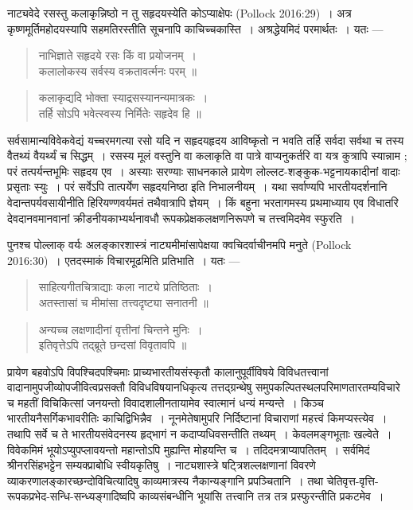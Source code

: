 {\dev नाट्यवेदे रसस्तु कलाकृन्निष्ठो न तु सहृदयस्येति कोऽप्याक्षेपः} (Pollock 2016:29){\dev~। अत्र कृष्णमूर्तिमहोदयस्यापि सहमतिरस्तीति सूचनापि काचिच्चकास्ति~। अश्रद्धेयमिदं परमार्थतः~। यतः ---}
\begin{quote}
{\dev नाभिज्ञाते सहृदये रसः किं वा प्रयोजनम्~।}\\
{\dev कलालोकस्य सर्वस्य वक्रतावर्त्मनः परम् ॥}
\end{quote}
\begin{quote}
{\dev कलाकृद्यदि भोक्ता स्याद्रसस्यानन्यमात्रकः~।}\\
{\dev तर्हि सोऽपि भवेत्स्वस्य निर्मितेः सहृदेव हि ॥}
\end{quote}

{\dev सर्वसामान्यविवेकवेद्यं यच्चरमगत्या रसो यदि न सहृदयहृदय आविष्कृतो न भवति तर्हि सर्वदा सर्वथा च तस्य वैतथ्यं वैयर्थ्यं च सिद्धम्~। रसस्य मूलं वस्तुनि वा कलाकृति वा पात्रे वाप्यनुकर्तरि वा  यत्र कुत्रापि स्यान्नाम ; परं तत्पर्यन्तभूमिः सहृदय एव~। अस्याः सरण्याः साधनकाले प्रायेण लोल्लट-शङ्कुक-भट्टनायकादीनां वादाः प्रसृताः स्युः~। परं सर्वेऽपि तात्पर्येण सहृदयनिष्ठा इति निभालनीयम्~। यथा सर्वाण्यपि भारतीयदर्शनानि वेदान्तपर्यवसायीनीति हिरियण्णवर्यमतं तथैवात्रापि ज्ञेयम्~। किं बहुना भरतागमस्य प्रथमाध्याय एव विधातरि देवदानवमानवानां क्रीडनीयकाभ्यर्थनावधौ रूपकप्रेक्षकलक्षणनिरूपणे च तत्त्वमिदमेव स्फुरति~।}

{\dev पुनश्च पोल्लाक् वर्यः अलङ्कारशास्त्रं नाट्यमीमांसापेक्षया क्वचिदर्वाचीनमपि मनुते} (Pollock 2016:30){\dev~। एतदस्माकं विचारमूढमिति प्रतिभाति~। यतः ---}
\begin{quote}
{\dev साहित्यगीतचित्राद्याः कला नाट्ये प्रतिष्ठिताः~।}\\
{\dev अतस्तासां च मीमांसा तत्त्वदृष्ट्या सनातनी ॥}
\end{quote}
\begin{quote}
{\dev अन्यच्च लक्षणादीनां वृत्तीनां चिन्तने मुनिः~।}\\
{\dev इतिवृत्तेऽपि तद्ब्रूते छन्दसां विवृतावपि ॥}
\end{quote}

{\dev प्रायेण बहवोऽपि विपश्चिदपश्चिमाः प्राच्यभारतीयसंस्कृतौ कालानुपूर्वीविषये विविधतत्त्वानां वादानामुपजीव्योपजीवित्वप्रसक्तौ विविधविषयानधिकृत्य तत्तद्ग्रन्थेषु समुपकल्पितस्थलपरि\-माणतारतम्यविचारे च महतीं विचिकित्सां जनयन्तो विवादशालीनतायामेव स्वात्मानं धन्यं मन्यन्ते~। किञ्च भारतीयनैसर्गिकभावरीतिः काचिद्विभिन्नैव~। नूनमेतेषामुपरि निर्दिष्टानां विचा\-राणां महत्त्वं किमप्यस्त्येव~। तथापि सर्वे च ते भारतीयसंवेदनस्य हृद्भागं न कदाप्यधिवसन्तीति तथ्यम्~। केवलमङ्गभूताः खल्वेते~। विवेकमिमं भूयोऽप्युपप्लावयन्तो महान्तोऽपि मुह्यन्ति मोहयन्ति च~। तदिदमत्राप्यापतितम्~। सर्वमिदं श्रीनरसिंहभट्टेन सम्यक्प्राबोधि स्वीयकृतिषु~। नाट्यशास्त्रे षट्त्रिशल्लक्षणानां विवरणे व्याकरणालङ्कारच्छन्दोविचित्यादिषु काव्यमात्रस्य नैका\-न्यङ्गानि प्रपञ्चितानि~। तथा चेतिवृत्त-वृत्ति-रूपकप्रभेद-सन्धि-सन्ध्यङ्गादिष्वपि काव्यसंबन्धीनि भूयांसि तत्त्वानि तत्र तत्र प्रस्फुरन्तीति प्रकटमेव~।} 


